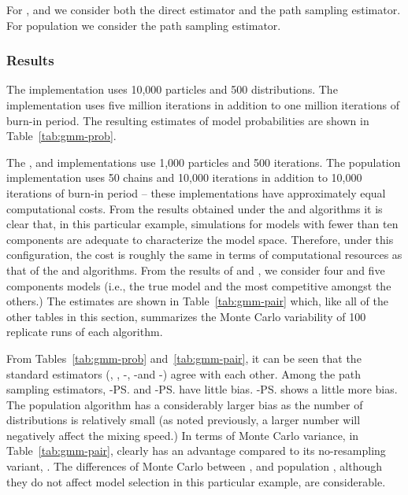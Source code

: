 For \smc[2], \smc[3] and \ais we consider both the direct estimator and the
path sampling estimator. For population \mcmc we consider the path sampling
estimator.

\subsubsection{Results}
\label{sec:gmm_res}

The \smc[1] implementation uses 10,000 particles and 500 distributions. The
\rjmcmc implementation uses five million iterations in addition to one million
iterations of burn-in period. The resulting estimates of model probabilities
are shown in Table~\ref{tab:gmm-prob}.

The \smc[2], \smc[3] and \ais implementations use 1,000 particles and 500
iterations. The population \mcmc implementation uses 50 chains and 10,000
iterations in addition to 10,000 iterations of burn-in period -- these
implementations have approximately equal computational costs. From the results
obtained under the \smc[1] and \rjmcmc algorithms it is clear that, in this
particular example, simulations for models with fewer than ten components are
adequate to characterize the model space. Therefore, under this configuration,
the cost is roughly the same in terms of computational resources as that of
the \smc[1] and \rjmcmc algorithms. From the results of \rjmcmc and \smc[1],
we consider four and five components models (i.e., the true model and the most
competitive amongst the others.) The estimates are shown in
Table~\ref{tab:gmm-pair} which, like all of the other tables in this section,
summarizes the Monte Carlo variability of 100 replicate runs of each
algorithm.




From Tables~\ref{tab:gmm-prob} and~\ref{tab:gmm-pair}, it can be seen that the
standard estimators (\rjmcmc, \smc[1], \smc[2]-\ds, \smc[3]-\ds and \ais-\ds)
agree with each other. Among the path sampling estimators, \smc[2]-\ps and
\ais-\ps have little bias. \smc[3]-\ps shows a little more bias. The
population \mcmc algorithm has a considerably larger bias as the number of
distributions is relatively small (as noted previously, a larger number will
negatively affect the mixing speed.) In terms of Monte Carlo variance, in
Table~\ref{tab:gmm-pair}, \smc[2] clearly has an advantage compared to its
no-resampling variant, \ais. The differences of Monte Carlo \sd between
\smc[2], \smc[3] and population \mcmc, although they do not affect model
selection in this particular example, are considerable.

